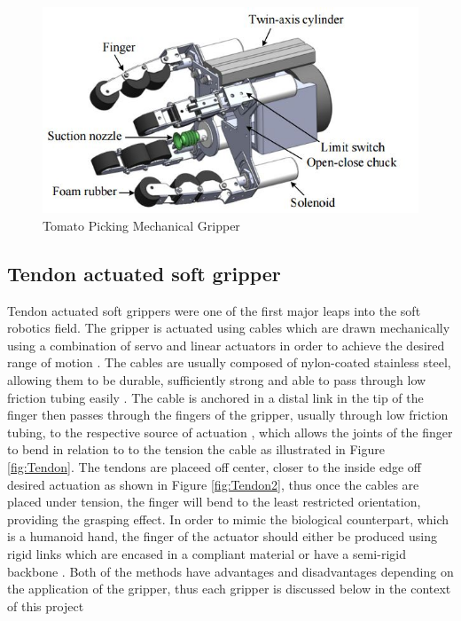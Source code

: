 \documentclass[11pt,twocolumn]{article}
\begin{document}
\begin{figure}[h]
\centering
\includegraphics[scale=0.6]{Mechanical2}
\caption{Tomato Picking Mechanical Gripper}
\label{fig:Mechanical2}
\end{figure}

\subsection{Tendon actuated soft gripper}
Tendon actuated soft grippers were one of the first major leaps into the soft robotics field. The gripper is actuated using cables which are drawn mechanically using a combination of servo and linear actuators in order to achieve the desired range of motion \cite{marchese2015recipe}. The cables are usually composed of nylon-coated stainless steel, allowing them to be durable, sufficiently strong and able to pass through low friction tubing easily \cite{dollar2010contact}. The cable is anchored in a distal link in the tip of the finger then passes through the fingers of the gripper, usually through low friction tubing, to the respective source of actuation \cite{dollar2010contact}, which allows the joints of the finger to bend in relation to to the tension the cable as illustrated in Figure \ref{fig:Tendon}. The tendons are placeed off center, closer to the inside edge off desired actuation as shown in Figure \ref{fig:Tendon2}, thus once the cables are placed under tension, the finger will bend to the least restricted orientation, providing the grasping effect. In order to mimic the biological counterpart, which is a humanoid hand, the finger of the actuator should either be produced using rigid links which are encased in a compliant material or have a semi-rigid backbone \cite{mutlu2016mechanical}. Both of the methods have advantages and disadvantages depending on the application of the gripper, thus each gripper is discussed below in the context of this project
\end{document}
